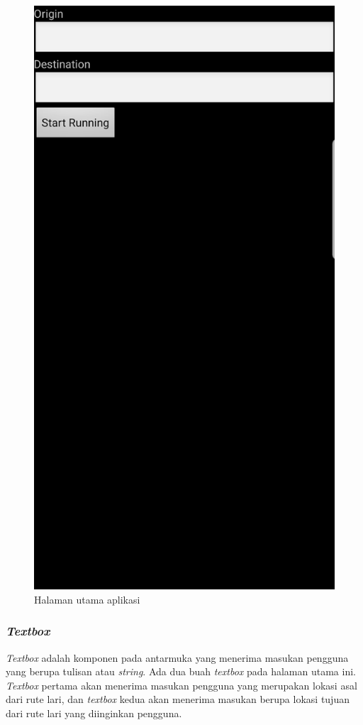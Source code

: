 \begin{figure}[h]
	\centering
		\includegraphics[scale=0.3]{Gambar/main-page.png}
	\caption{Halaman utama aplikasi}
	\label{fig:main-page}
\end{figure}

\subsubsection{\textit{Textbox}} 
\textit{Textbox} adalah komponen pada antarmuka yang menerima masukan pengguna yang berupa tulisan atau \textit{string}. Ada dua buah \textit{textbox} pada halaman utama ini. \textit{Textbox} pertama akan menerima masukan pengguna yang merupakan lokasi asal dari rute lari, dan \textit{textbox} kedua akan menerima masukan berupa lokasi tujuan dari rute lari yang diinginkan pengguna.   

